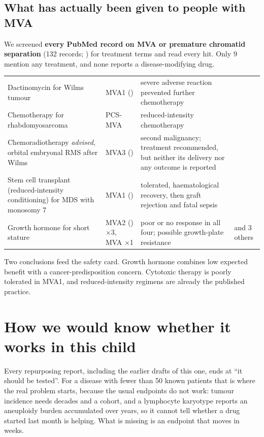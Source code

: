 \documentclass[10pt]{article}
\begin{document}
\subsection{What has actually been given to people with MVA}
\label{sec:casos}
We screened \textbf{every PubMed record on MVA or premature chromatid separation} (132 records;
) for treatment terms and read every hit. Only 9 mention any treatment, and none reports a
disease-modifying drug.
\begin{table}[H]\tablefont
\begin{tabularx}{\linewidth}{@{}P{4.4cm}P{2.3cm}LP{1.9cm}@{}}
\toprule{} &  &  & \\\midrule
Dactinomycin for Wilms tumour & MVA1 () & severe adverse reaction prevented further chemotherapy & \\
Chemotherapy for rhabdomyosarcoma & PCS-MVA & reduced-intensity chemotherapy & \\
Chemoradiotherapy \emph{advised}, orbital embryonal RMS after Wilms & MVA3 () & second malignancy; treatment recommended, but neither its delivery nor any outcome is reported & \\
Stem cell transplant (reduced-intensity conditioning) for MDS with monosomy 7 & MVA1 () & tolerated, haematological recovery, then graft rejection and fatal sepsis & \\
Growth hormone for short stature & MVA2 () ×3, MVA ×1 & poor or no response in all four; possible growth-plate resistance &  and 3 others\\\bottomrule
\end{tabularx}\end{table}
Two conclusions feed the safety card. Growth hormone combines low expected benefit with a cancer-predisposition
concern. Cytotoxic therapy is poorly tolerated in MVA1, and reduced-intensity regimens are already the published
practice.

\section{How we would know whether it works in this child}
\label{sec:medir}

Every repurposing report, including the earlier drafts of this one, ends at ``it should be tested''. For a disease
with fewer than 50 known patients that is where the real problem starts, because the usual endpoints do not work:
tumour incidence needs decades and a cohort, and a lymphocyte karyotype reports an aneuploidy burden accumulated
over years, so it cannot tell whether a drug started last month is helping. What is missing is an endpoint that
moves in weeks.
\end{document}
